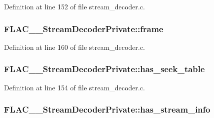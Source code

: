 Definition at line 152 of file stream\+\_\+decoder.\+c.

\subsubsection[{\texorpdfstring{frame}{frame}}]{ F\+L\+A\+C\+\_\+\+\_\+\+Stream\+Decoder\+Private\+::frame}\hypertarget{struct_f_l_a_c_____stream_decoder_private_a2089f858bf74312c21e68bd5de431219}{}\label{struct_f_l_a_c_____stream_decoder_private_a2089f858bf74312c21e68bd5de431219}


Definition at line 160 of file stream\+\_\+decoder.\+c.

\subsubsection[{\texorpdfstring{has\+\_\+seek\+\_\+table}{has_seek_table}}]{ F\+L\+A\+C\+\_\+\+\_\+\+Stream\+Decoder\+Private\+::has\+\_\+seek\+\_\+table}\hypertarget{struct_f_l_a_c_____stream_decoder_private_a2342ea5264765bff36b5e41dffd49fcc}{}\label{struct_f_l_a_c_____stream_decoder_private_a2342ea5264765bff36b5e41dffd49fcc}


Definition at line 154 of file stream\+\_\+decoder.\+c.

\subsubsection[{\texorpdfstring{has\+\_\+stream\+\_\+info}{has_stream_info}}]{ F\+L\+A\+C\+\_\+\+\_\+\+Stream\+Decoder\+Private\+::has\+\_\+stream\+\_\+info}\hypertarget{struct_f_l_a_c_____stream_decoder_private_af7aad9e9efbef7dc506a3c4e45acee01}{}\label{struct_f_l_a_c_____stream_decoder_private_af7aad9e9efbef7dc506a3c4e45acee01}


